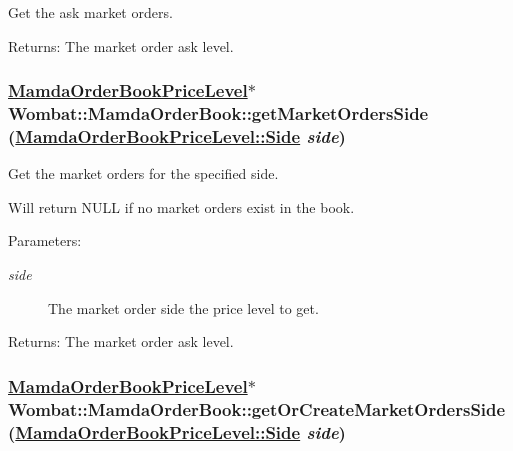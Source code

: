 Get the ask market orders. 

\begin{Desc}
\item[Returns:]The market order ask level. \end{Desc}
\hypertarget{classWombat_1_1MamdaOrderBook_819621cc76a4c07cf4f5fff5d3ec9b66}{
\subsubsection[getMarketOrdersSide]{\setlength{\rightskip}{0pt plus 5cm}\hyperlink{classWombat_1_1MamdaOrderBookPriceLevel}{Mamda\-Order\-Book\-Price\-Level}$\ast$ Wombat::Mamda\-Order\-Book::get\-Market\-Orders\-Side (\hyperlink{classWombat_1_1MamdaOrderBookPriceLevel_384c34b0a74d874b8969dee9b0d3718d}{Mamda\-Order\-Book\-Price\-Level::Side} {\em side})}}
\label{classWombat_1_1MamdaOrderBook_819621cc76a4c07cf4f5fff5d3ec9b66}


Get the market orders for the specified side. 

Will return NULL if no market orders exist in the book.

\begin{Desc}
\item[Parameters:]
\begin{description}
\item[{\em side}]The market order side the price level to get. \end{description}
\end{Desc}
\begin{Desc}
\item[Returns:]The market order ask level. \end{Desc}
\hypertarget{classWombat_1_1MamdaOrderBook_27ab4bac9193b18a3081bae39ccb3cf2}{
\subsubsection[getOrCreateMarketOrdersSide]{\setlength{\rightskip}{0pt plus 5cm}\hyperlink{classWombat_1_1MamdaOrderBookPriceLevel}{Mamda\-Order\-Book\-Price\-Level}$\ast$ Wombat::Mamda\-Order\-Book::get\-Or\-Create\-Market\-Orders\-Side (\hyperlink{classWombat_1_1MamdaOrderBookPriceLevel_384c34b0a74d874b8969dee9b0d3718d}{Mamda\-Order\-Book\-Price\-Level::Side} {\em side})}}
\label{classWombat_1_1MamdaOrderBook_27ab4bac9193b18a3081bae39ccb3cf2}


